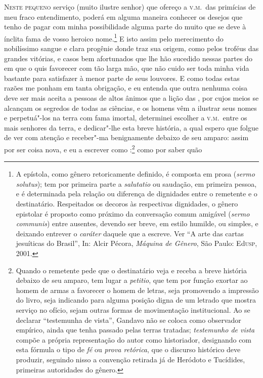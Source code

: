 \noindent\textsc{Neste pequeno} serviço (muito ilustre senhor) que ofereço a \textsc{v.m.}~das
primícias de meu fraco entendimento, poderá em alguma maneira conhecer os
desejos que tenho de pagar com minha possibilidade alguma parte do muito
que se deve à ínclita fama de vosso heroico nome.\footnote{ A epístola,
como gênero retoricamente definido, é composta em prosa (\textit{sermo
solutus}); tem por primeira parte a \textit{salutatio} ou saudação, em
primeira pessoa, e é determinada pela relação ou diferença de
dignidades entre o remetente e o destinatário. Respeitados os decoros
às respectivas dignidades, o gênero epistolar é proposto como próximo
da conversação comum amigável (\textit{sermo communis}) entre ausentes,
devendo ser breve, em estilo humilde, ou simples, e deixando entrever o
\textit{caráter} daquele que a escreve. Ver ``A arte das cartas jesuíticas do Brasil'', In: 
Alcir Pécora, \textit{Máquina de Gênero}, São Paulo: Ed\textsc{usp}, 2001.} E isto assim pelo
merecimento do nobilíssimo sangue e clara progênie donde traz sua
origem, como pelos troféus das grandes vitórias, e casos bem
afortunados que lhe hão sucedido nessas partes do  em que  o
quis favorecer com tão larga mão, que não cuido ser toda minha vida
bastante para satisfazer à menor parte de seus louvores. E como todas
estas razões me ponham em tanta obrigação, e eu entenda que outra
nenhuma coisa deve ser mais aceita a pessoas de altos ânimos que a lição
das , por cujos meios se alcançam os segredos de todas as 	
ciências, e os homens vêm a ilustrar seus nomes e perpetuá"-los na terra
com fama imortal, determinei escolher a \textsc{v.m.}~entre os mais senhores da
terra, e dedicar"-lhe esta breve história, a qual espero que folgue de				%
ver com atenção e receber"-ma benignamente debaixo de seu amparo: assim
por ser coisa nova, e eu a escrever como :\footnote{ Quando 
o remetente pede que o destinatário veja e receba a breve
história debaixo de seu amparo, tem lugar a \textit{petitio}, que tem		
por função exortar ao homem de armas a favorecer o homem de letras,
seja promovendo a impressão do livro, seja indicando para alguma
posição digna de um letrado que mostra serviço no ofício, sejam outras
formas de movimentação institucional. Ao se declarar
``testemunha de vista'', Gandavo não se
coloca como observador empírico, ainda que tenha passado pelas terras
tratadas; \textit{testemunho de vista} compõe a própria representação
do autor como historiador, designando com esta fórmula o tipo de
\textit{fé} ou \textit{prova retórica}, que o discurso histórico deve
produzir, seguindo nisso a convenção retirada já de Heródoto e
Tucídides, primeiras autoridades do gênero.} como por saber quão
